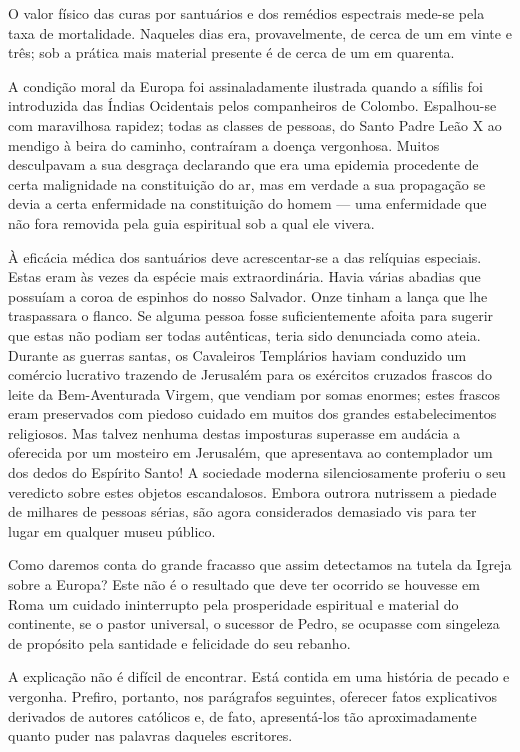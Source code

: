 \documentclass[11pt,a5paper,twoside,openany]{book}
\begin{document}
O valor físico das curas por santuários e dos remédios espectrais mede-se pela taxa de mortalidade. Naqueles dias era, provavelmente, de cerca de um em vinte e três; sob a prática mais material presente é de cerca de um em quarenta.

A condição moral da Europa foi assinaladamente ilustrada quando a sífilis foi introduzida das Índias Ocidentais pelos companheiros de Colombo. Espalhou-se com maravilhosa rapidez; todas as classes de pessoas, do Santo Padre Leão X ao mendigo à beira do caminho, contraíram a doença vergonhosa. Muitos desculpavam a sua desgraça declarando que era uma epidemia procedente de certa malignidade na constituição do ar, mas em verdade a sua propagação se devia a certa enfermidade na constituição do homem — uma enfermidade que não fora removida pela guia espiritual sob a qual ele vivera.

À eficácia médica dos santuários deve acrescentar-se a das relíquias especiais. Estas eram às vezes da espécie mais extraordinária. Havia várias abadias que possuíam a coroa de espinhos do nosso Salvador. Onze tinham a lança que lhe traspassara o flanco. Se alguma pessoa fosse suficientemente afoita para sugerir que estas não podiam ser todas autênticas, teria sido denunciada como ateia. Durante as guerras santas, os Cavaleiros Templários haviam conduzido um comércio lucrativo trazendo de Jerusalém para os exércitos cruzados frascos do leite da Bem-Aventurada Virgem, que vendiam por somas enormes; estes frascos eram preservados com piedoso cuidado em muitos dos grandes estabelecimentos religiosos. Mas talvez nenhuma destas imposturas superasse em audácia a oferecida por um mosteiro em Jerusalém, que apresentava ao contemplador um dos dedos do Espírito Santo! A sociedade moderna silenciosamente proferiu o seu veredicto sobre estes objetos escandalosos. Embora outrora nutrissem a piedade de milhares de pessoas sérias, são agora considerados demasiado vis para ter lugar em qualquer museu público.

Como daremos conta do grande fracasso que assim detectamos na tutela da Igreja sobre a Europa? Este não é o resultado que deve ter ocorrido se houvesse em Roma um cuidado ininterrupto pela prosperidade espiritual e material do continente, se o pastor universal, o sucessor de Pedro, se ocupasse com singeleza de propósito pela santidade e felicidade do seu rebanho.

A explicação não é difícil de encontrar. Está contida em uma história de pecado e vergonha. Prefiro, portanto, nos parágrafos seguintes, oferecer fatos explicativos derivados de autores católicos e, de fato, apresentá-los tão aproximadamente quanto puder nas palavras daqueles escritores.
\end{document}
